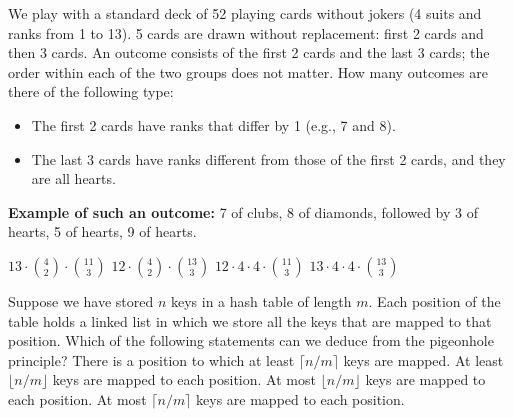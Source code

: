 We play with a standard deck of 52 playing cards without jokers (4 suits and ranks from 1 to 13).
5 cards are drawn without replacement: first 2 cards and then 3 cards.
An outcome consists of the first 2 cards and the last 3 cards; the order within each of the two groups does not matter.
How many outcomes are there of the following type:
\begin{itemize}
\item The first 2 cards have ranks that differ by 1 (e.g., 7 and 8).
\item The last 3 cards have ranks different from those of the first 2 cards, and they are all hearts.
\end{itemize}

\textbf{Example of such an outcome:} 7 of clubs, 8 of diamonds, followed by 3 of hearts, 5 of hearts, 9 of hearts.

\oneanswer
\optionsstart
\answer \(13 \cdot \binom{4}{2} \cdot \binom{11}{3}\)
\answer \(12 \cdot \binom{4}{2} \cdot \binom{13}{3}\)
\answer \(12 \cdot 4 \cdot 4 \cdot \binom{11}{3}\)\correct
{}
\answer \(13 \cdot 4 \cdot 4 \cdot \binom{13}{3}\)
\optionsend



Suppose we have stored \(n\) keys in a hash table of length \(m\).
Each position of the table holds a linked list in which we store all the keys that are mapped to that position.
Which of the following statements can we deduce from
the pigeonhole principle?
\oneanswer
\optionsstart
\answer There is a position to which at least \(\lceil n/m \rceil\) keys are mapped. \correct
\answer At least \(\lfloor n/m \rfloor\) keys are mapped to each position.
\answer At most \(\lfloor n/m \rfloor\) keys are mapped to each position.
\answer At most \(\lceil n/m \rceil\) keys are mapped to each position.
\optionsend
{}


